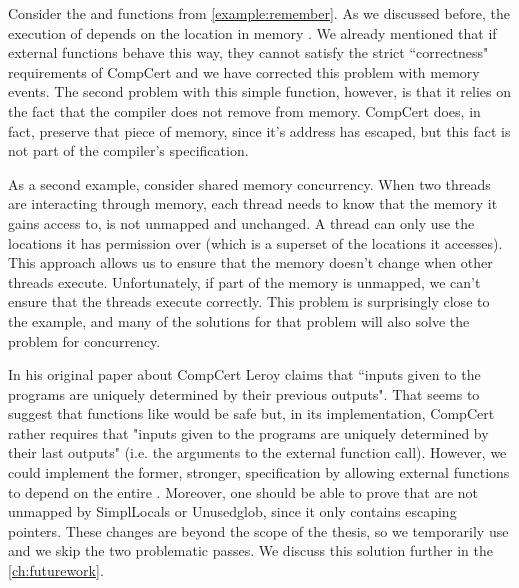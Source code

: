 Consider the  and  functions from \autoref{example:remember}. As we discussed before, the execution of  depends on the location in memory . We already mentioned that if external functions behave this way, they cannot satisfy the strict ``correctness" requirements of CompCert and we have corrected this problem with memory events. The second problem with this simple function, however, is that it relies on the fact that the compiler does not remove  from memory. CompCert does, in fact, preserve that piece of memory, since it's address has escaped, but this fact is not part of the compiler's specification. 

As a second example, consider shared memory concurrency. When two threads are interacting through memory, each thread needs to know that the memory it gains access to, is not unmapped and unchanged. A thread can only use the locations it has permission over (which is a superset of the locations it accesses). This approach allows us to ensure that the memory doesn't change when other threads execute. Unfortunately, if part of the memory is unmapped, we can't ensure that the threads execute correctly. This problem is surprisingly close to the   example, and many of the solutions for that problem will also solve the problem for concurrency. 

In his original paper about CompCert Leroy \cite{Leroy-Compcert-CACM} claims that ``inputs given to the programs are uniquely determined by their previous outputs". That seems to suggest that functions like  would be safe but, in its implementation, CompCert rather requires that "inputs given to the programs are uniquely determined by their last outputs" (i.e. the arguments to the external function call). However, we could implement the former, stronger, specification by allowing external functions to depend on the entire  . Moreover, one should be able to prove that  are not unmapped by SimplLocals or Unusedglob, since it only contains escaping pointers. These changes are beyond the scope of the thesis, so we temporarily use  and we skip the two problematic passes. We discuss this solution further in the \autoref{ch:futurework}.

